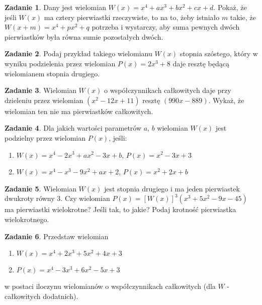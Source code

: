 \documentclass{uoom}
\theoremstyle{definition}
\newtheorem{zadd}{Zadanie}
\newenvironment{zadanie}{
  \begin{zadd}
  }
  {
    \end{zadd}\vspace{\ooodstep}
  }
\begin{document}
\begin{zadanie}
  Dany jest wielomian $W(x)=x^4+ax^3+bx^2+cx+d$. Pokaż, że jeśli $W(x)$ ma cztery pierwiastki rzeczywiste, to na to, żeby istniało $m$ takie, że $W(x+m)=x^4+px^2+q$ potrzeba i wystarczy, aby suma pewnych dwóch pierwiastków była równa sumie pozostałych dwóch. 
\end{zadanie}


\begin{zadanie}
  Podaj przykład takiego wielomianu $W(x)$ stopnia szóstego, który w wyniku podzielenia przez wielomian $P(x)=2x^3+8$ daje resztę będącą wielomianem stopnia drugiego.
\end{zadanie}

\begin{zadanie}
  Wielomian $W(x)$ o współczynnikach całkowitych daje przy dzieleniu przez wielomian $(x^2-12x+11)$ resztę $(990x-889)$. Wykaż, że wielomian ten nie ma pierwiastków całkowitych.
\end{zadanie}

\begin{zadanie}
  Dla jakich wartości parametrów $a$, $b$ wielomian $W(x)$ jest podzielny przez wielomian $P(x)$, jeśli:
  \begin{enumerate}
    \item $W(x)=x^4-2x^3+ax^2-3x+b$, $P(x)=x^2-3x+3$
    \item $W(x)=x^4-x^3-9x^2+ax+2$, $P(x)=x^2+2x+b$
  \end{enumerate}
\end{zadanie}

\begin{zadanie}
  Wielomian $W(x)$ jest stopnia drugiego i ma jeden pierwiastek dwukroty równy $3$. Czy wielomian $P(x)=[W(x)]^3(x^3+5x^2-9x-45)$ ma pierwiastki wielokrotne? Jeśli tak, to jakie? Podaj krotność pierwiastka wielokrotnego.
\end{zadanie}

\begin{zadanie}
  Przedstaw wielomian 
  \begin{enumerate}
    \item $W(x)=x^4+2x^3+5x^2+4x+3$ 
    \item $P(x)=x^4-3x^3+6x^2-5x+3$
  \end{enumerate}
  w postaci iloczynu wielomianów o współczynnikach całkowitych (dla $W$ - całkowitych dodatnich). 
\end{zadanie}
\end{document}
